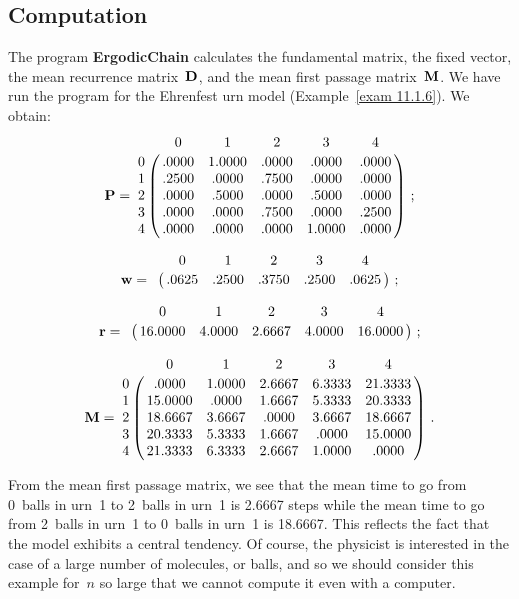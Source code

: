 \subsection*{Computation}
The program {\bf ErgodicChain}
calculates the fundamental matrix, the fixed vector, the mean recurrence
matrix~${\mbox{\bf D}\/}$, 
and the mean first passage matrix~${\mbox{\bf M}\/}$.  We have run the program for the
Ehrenfest 
urn model (Example~\ref{exam 11.1.6}). 
We obtain:
$$
\mat {P} = \bordermatrix{
    &  0  & 1 & 2 & 3 & 4 \cr
  0 &   .0000 & 1.0000 &  .0000 &  .0000 &  .0000\cr
  1 &   .2500 & .0000  &  .7500 &  .0000 &  .0000\cr
  2 &   .0000 & .5000  &  .0000 &  .5000 &  .0000\cr
  3 &   .0000 & .0000  &  .7500 &  .0000 &  .2500\cr
  4 &   .0000 & .0000  &  .0000 &  1.0000&  .0000}\ ;
$$
 
$$
\mat {w} = \bordermatrix{
  &     0  &   1   &   2   &   3   &    4\cr
  & .0625  &.2500  &.3750  &.2500  &.0625}\ ;
$$

$$
\mat {r} = \bordermatrix{
  &       0  &      1  &      2 &       3 &       4\cr
  & 16.0000  & 4.0000  & 2.6667 &  4.0000 & 16.0000}\ ;
$$

$$
\mat {M} = \bordermatrix{
  &        0 &      1 &      2 &       3 &       4\cr
0 &    .0000 & 1.0000 & 2.6667 &  6.3333 & 21.3333\cr
1 &  15.0000 &  .0000 & 1.6667 &  5.3333 & 20.3333\cr
2 &  18.6667 & 3.6667 &  .0000 &  3.6667 & 18.6667\cr
3 &  20.3333 & 5.3333 & 1.6667 &   .0000 & 15.0000\cr
4 &  21.3333 & 6.3333 & 2.6667 &  1.0000 &   .0000}\ .
$$ 
\par
From the mean first passage matrix, we see that the mean time to go from
0~balls in urn~1 to 2~balls in urn~1 is 2.6667 steps while the mean time to go
from 2~balls in urn~1 to 0~balls in urn~1 is 18.6667.  This reflects the
fact that the model exhibits a central tendency.  Of course, the physicist is
interested in the case of a large number of molecules, or balls, and so we
should consider this example for~$n$ so large that we cannot compute it even
with a computer.

